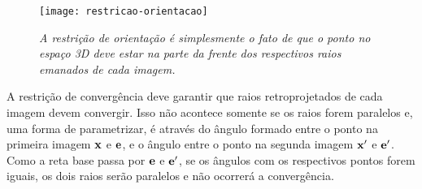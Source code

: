 \begin{figure}[!htb]
\centering
\texttt{[image: restricao-orientacao]}
\caption{\textit{A restrição de orientação é simplesmente o fato de que o ponto no espaço 3D deve estar na parte da frente dos respectivos raios emanados de cada imagem.}}
\label{retr-orien}
\end{figure}

A restrição de convergência deve garantir que raios retroprojetados de cada imagem devem convergir. Isso não acontece somente se os raios forem paralelos e, uma forma de parametrizar, é através do ângulo formado entre o ponto na primeira imagem ${\bf x}$ e ${\bf e}$, e o ângulo entre o ponto na segunda imagem ${\bf x'}$ e ${\bf e'}$. Como a reta base passa por ${\bf e}$ e ${\bf e'}$, se os ângulos com os respectivos pontos forem iguais, os dois raios serão paralelos e não ocorrerá a convergência.


